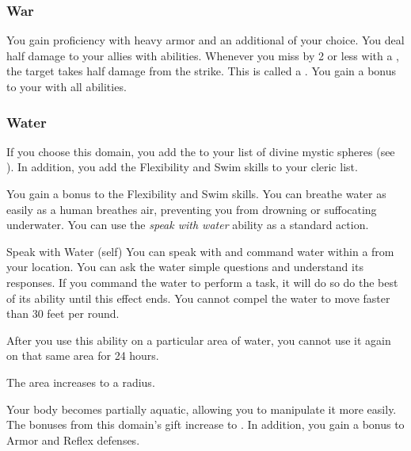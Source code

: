         \subsubsection{War}
             You gain proficiency with heavy armor and an additional  of your choice.
             You deal half damage to your allies with  abilities.
             Whenever you miss by 2 or less with a , the target takes half damage from the strike.
            This is called a .
             You gain a  bonus to your  with all abilities.

        \subsubsection{Water}
            If you choose this domain, you add the   to your list of divine mystic spheres (see ).
            In addition, you add the Flexibility and Swim skills to your cleric  list.

             You gain a  bonus to the Flexibility and Swim skills.
             You can breathe water as easily as a human breathes air, preventing you from drowning or suffocating underwater.
             You can use the \textit{speak with water} ability as a standard action.
            \begin{attuneability}{Speak with Water}
                 (self)
                \rankline
                You can speak with and command water within a \areahuge {} from your location.
                You can ask the water simple questions and understand its responses.
                If you command the water to perform a task, it will do so do the best of its ability until this effect ends.
                You cannot compel the water to move faster than 30 feet per round.

                After you use this ability on a particular area of water, you cannot use it again on that same area for 24 hours.

                \rankline
                 The area increases to a \areagarg radius.
            \end{attuneability}
             Your body becomes partially aquatic, allowing you to manipulate it more easily.
            The bonuses from this domain's gift increase to .
            In addition, you gain a  bonus to Armor and Reflex defenses.

